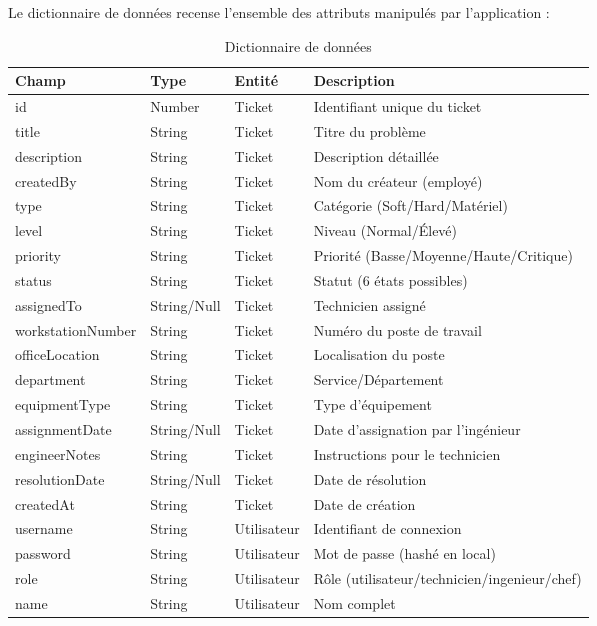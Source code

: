\documentclass[12pt,a4paper,twoside]{report}
\begin{document}
Le dictionnaire de données recense l'ensemble des attributs manipulés par l'application :

\begin{longtable}{p{3.5cm} p{2.5cm} p{2cm} p{5cm}}
    \caption{Dictionnaire de données}
    \label{tab:dictionary} \\
    \toprule
    \textbf{Champ} & \textbf{Type} & \textbf{Entité} & \textbf{Description} \\
    \midrule
    \endhead
    \bottomrule
    \endfoot
    
    id & Number & Ticket & Identifiant unique du ticket \\
    title & String & Ticket & Titre du problème \\
    description & String & Ticket & Description détaillée \\
    createdBy & String & Ticket & Nom du créateur (employé) \\
    type & String & Ticket & Catégorie (Soft/Hard/Matériel) \\
    level & String & Ticket & Niveau (Normal/Élevé) \\
    priority & String & Ticket & Priorité (Basse/Moyenne/Haute/Critique) \\
    status & String & Ticket & Statut (6 états possibles) \\
    assignedTo & String/Null & Ticket & Technicien assigné \\
    workstationNumber & String & Ticket & Numéro du poste de travail \\
    officeLocation & String & Ticket & Localisation du poste \\
    department & String & Ticket & Service/Département \\
    equipmentType & String & Ticket & Type d'équipement \\
    assignmentDate & String/Null & Ticket & Date d'assignation par l'ingénieur \\
    engineerNotes & String & Ticket & Instructions pour le technicien \\
    resolutionDate & String/Null & Ticket & Date de résolution \\
    createdAt & String & Ticket & Date de création \\
    username & String & Utilisateur & Identifiant de connexion \\
    password & String & Utilisateur & Mot de passe (hashé en local) \\
    role & String & Utilisateur & Rôle (utilisateur/technicien/ingenieur/chef) \\
    name & String & Utilisateur & Nom complet \\
    \end{longtable}
\end{document}
